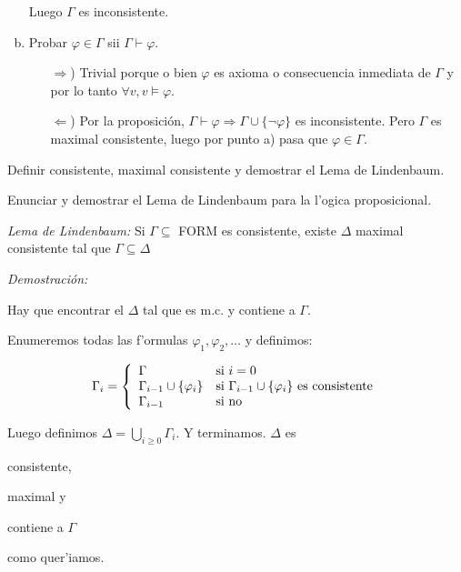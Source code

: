 \begin{questions}
\begin{solution}
\begin{enumerate}[a)]
  Luego $\Gamma$ es inconsistente.
  
  \item Probar $\varphi\in\Gamma$ sii $\Gamma\vdash\varphi$. 
  
  \begin{itemize}
   \item[$\Rightarrow$)] Trivial porque o bien $\varphi$ es axioma o consecuencia inmediata de $\Gamma$ y por lo tanto $\forall v, v\vDash\varphi$. 
   \item[$\Leftarrow$)] Por la proposici\'on, $\Gamma\vdash\varphi \Rightarrow \Gamma\cup\{\neg\varphi\}$ es inconsistente. Pero $\Gamma$ es maximal consistente, luego por punto a) pasa que $\varphi\in\Gamma$.
  \end{itemize}

 \end{enumerate}

\end{solution}

\question Definir consistente, maximal consistente y demostrar el Lema de Lindenbaum. 


\question Enunciar y demostrar el Lema de Lindenbaum para la l'ogica proposicional.


\begin{solution}

{\it Lema de Lindenbaum:} Si $\Gamma \subseteq$ FORM es consistente, existe $\Delta$ maximal consistente tal que $\Gamma \subseteq \Delta$

{\it Demostraci\'on: }

Hay que encontrar el $\Delta$ tal que es m.c. y contiene a $\Gamma$. 

Enumeremos todas las f'ormulas $\varphi_1, \varphi_2, \dots$ y definimos: 

$$\Gamma_i = \left\{
  \begin{array}{l l}
  \Gamma 				& \text{si } i = 0 \\
  \Gamma_{i-1} \cup \{ \varphi_i \} 	& \text{si } \Gamma_{i-1} \cup \{ \varphi_i \} \text{ es consistente} \\ 
  \Gamma_{i-1} 				& \text{si no} 
  \end{array}
  \right.
  $$

Luego definimos $\Delta = \bigcup_{i\geq 0} \Gamma_i$. Y terminamos. $\Delta$ es \begin{inparaenum}[(a)] \item consistente, \item maximal y \item contiene a $\Gamma$ \end{inparaenum} como quer'iamos.


\end{solution}
\end{questions}
